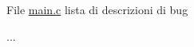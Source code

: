 \label{bug__bug000001}
\hypertarget{bug__bug000001}{}
 
\begin{DoxyDescription}
\item[File \hyperlink{main_8c}{main.c} ]lista di descrizioni di bug 

... 
\end{DoxyDescription}
